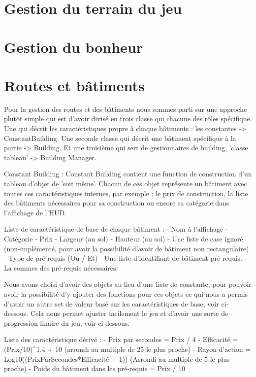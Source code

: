 \documentclass[a4paper,10pt,openany,oneside]{book}
\begin{document}
\section{Gestion du terrain du jeu}

\section{Gestion du  bonheur}

\section{Routes et bâtiments}
Pour la gestion des routes et des bâtiments nous sommes parti sur une approche plutôt simple qui est d'avoir divisé en trois classe qui chacune des rôles spécifique. Une qui décrit les caractéristiques propre à chaque bâtiments : les constantes -> ConstantBuilding. Une seconde classe qui décrit une bâtiment spécifique à la partie -> Building. Et une troisième qui sert de gestionnaires de building, 'classe tableau' -> Building Manager. 

Constant Building :
Constant Building contient une function de construction d'un tableau d'objet de 'soit même'. Chacun de ces objet représente un bâtiment avec toutes ces caractéristiques internes, par exemple : le prix de construction, la liste des bâtiments nécessaires pour sa construction ou encore sa catégorie dans l'affichage de l'HUD.

Liste de caractéristique de base de chaque bâtiment :
- Nom à l'affichage
- Catégorie
- Prix
- Largeur (au sol)
- Hauteur (au sol)
- Une liste de case ignoré (non-implémenté, pour avoir la possibilité d'avoir de bâtiment non rectangulaire)
- Type de pré-requis (Ou / Et)
- Une liste d'identifiant de bâtiment pré-requis.
- La sommes des pré-requis nécessaires.

Nous avons choisi d'avoir des objets au lieu d'une liste de constante, pour pouvoir avoir la possibilité d'y ajouter des fonctions pour ces objets ce qui nous a permis d'avoir un autre set de valeur basé sur les caractéristiques de base, voir ci-dessous. Cela nous permet ajuster facilement le jeu et d'avoir une sorte de progression linaire du jeu, voir ci-dessous.

Liste des caractéristique dérivé :
- Prix par secondes = Prix / 4
- Efficacité = (Prix/10)^1.4 + 10 (arrondi au multiple de 25 le plus proche)
- Rayon d'action = Log10((PrixParSecondes*Efficacité + 1)) (Arrondi au multiple de 5 le plus proche)
- Poids du bâtiment dans les pré-requis = Prix / 10
\end{document}
